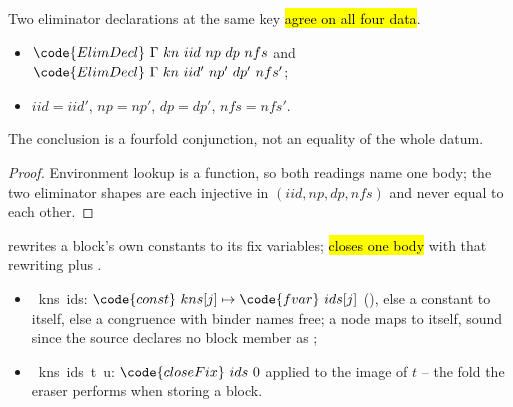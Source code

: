 \begin{lemma}
\label{lem:ElimDecl-uniq}
\leanok
{}
 Two eliminator declarations at the same key \hl{agree on all four data}.
\begin{itemize}
\item {} $\code{ElimDecl}\ \Gamma\ kn\ iid\ np\ dp\ nfs$ and
$\code{ElimDecl}\ \Gamma\ kn\ iid'\ np'\ dp'\ nfs'$;
\item {} $iid = iid'$, $np = np'$, $dp = dp'$, $nfs = nfs'$.
\end{itemize}
 The conclusion is a fourfold conjunction, not an equality of the whole
datum.
\end{lemma}
\begin{proof}
\leanok
{}
 Environment lookup is a function, so both readings name one body; the two eliminator shapes
are each injective in $(iid, np, dp, nfs)$ and never equal to each other.
\end{proof}

\begin{definition}
\label{def:ConstToFVar}
\leanok
{}
  rewrites a block's own constants to its fix variables;
 \hl{closes one body} with that rewriting plus .
\begin{itemize}
\item {}\ kns\ ids: $\code{const}\ kns[j] \mapsto \code{fvar}\ ids[j]$
(), else a constant to itself, else a congruence with binder names free; a  node
maps to itself, sound since the source declares no block member as ;
\item {}\ kns\ ids\ t\ u: $\code{closeFix}\ ids\ 0$ applied to the
 image of $t$ -- the fold the eraser performs when storing a block.
\end{itemize}
\end{definition}

